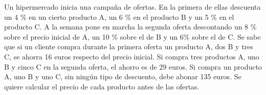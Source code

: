 \documentclass[addpoints,spanish, 12pt,a4paper]{exam}
\begin{document}
\begin{questions}




\question Un hipermercado inicia una campaña de ofertas. En la primera de
ellas descuenta un 4 \% en un cierto producto A, un 6 \% en el producto B y un 5 \% en el producto
C. A la semana pone en marcha la segunda oferta descontando un 8 \% sobre el precio inicial
de A, un 10 \% sobre el de B y un 6\% sobre el de C.
Se sabe que si un cliente compra durante la primera oferta un producto A, dos B y tres C, se
ahorra 16 euros respecto del precio inicial. Si compra tres productos A, uno B y cinco C en la
segunda oferta, el ahorro es de 29 euros. Si compra un producto A, uno B y uno C, sin ningún
tipo de descuento, debe abonar 135 euros. Se quiere calcular el precio de cada producto antes de las ofertas.


\end{questions}
\end{document}
